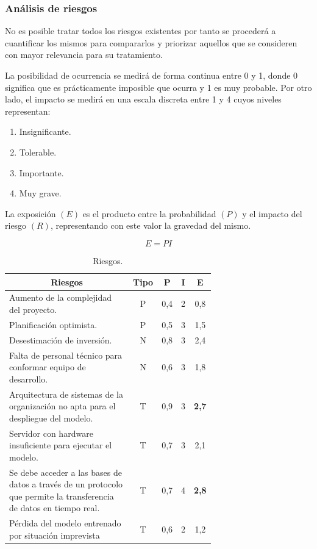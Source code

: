\documentclass[a4paper,12pt]{article}
\begin{document}
\clearpage

\subsubsection{Análisis de riesgos}
No es posible tratar todos los riesgos existentes por tanto se procederá a cuantificar los mismos para compararlos y priorizar aquellos que se consideren con mayor relevancia para su tratamiento. 

La posibilidad de ocurrencia se medirá de forma continua entre 0 y 1, donde 0 significa que es prácticamente imposible que ocurra y 1 es muy probable. Por otro lado, el impacto se medirá en una escala discreta entre 1 y 4 cuyos niveles representan:
\begin{enumerate}[noitemsep, topsep=2pt]
	\item Insignificante.
	\item Tolerable.
	\item Importante.
	\item Muy grave.
\end{enumerate}

La exposición $(E)$ es el producto entre la probabilidad $(P)$ y el impacto del riesgo $(R)$, representando con este valor la gravedad del mismo.

$$ E = PI $$

\begin{table}[H]
	\centering
	\begin{tabular}{p{0.67\linewidth} c c c c}
		\hline
		\multicolumn{1}{c}{\textbf{Riesgos}} &
		\multicolumn{1}{c}{\textbf{Tipo}} &
		\multicolumn{1}{c}{\textbf{P}} &
		\multicolumn{1}{c}{\textbf{I}} &
		\multicolumn{1}{c}{\textbf{E}} \\ \hline
		Aumento de la complejidad del proyecto.                         & P & 0,4 & 2 & 0,8 \\
		Planificación optimista.                                       & P & 0,5 & 3 & 1,5 \\
		Desestimación de inversión.                                   & N & 0,8 & 3 & 2,4 \\
		Falta de personal técnico para conformar equipo de desarrollo. & N & 0,6 & 3 & 1,8 \\
		Arquitectura de sistemas de la organización no apta para el despliegue del modelo. &
		T &
		0,9 &
		3 &
		\textbf{2,7} \\
		Servidor con hardware insuficiente para ejecutar el modelo.     & T & 0,7 & 3 & 2,1 \\
		Se debe acceder a las bases de datos a través de un protocolo que permite la transferencia de datos en tiempo real. &
		T &
		0,7 &
		4 &
		\textbf{2,8} \\
		Pérdida del modelo entrenado por situación imprevista         & T & 0,6 & 2 & 1,2 \\ \hline
	\end{tabular}
	\caption{Riesgos.}
	\label{tab:risk-table}
\end{table}
\end{document}
